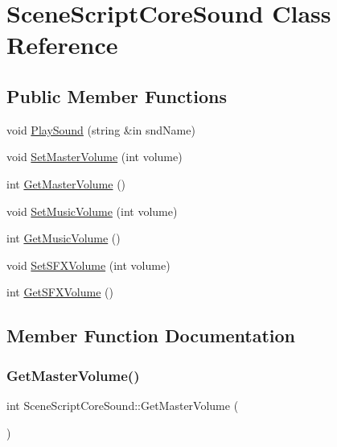 \hypertarget{class_scene_script_core_sound}{}\section{Scene\+Script\+Core\+Sound Class Reference}
\label{class_scene_script_core_sound}
\subsection*{Public Member Functions}
\begin{DoxyCompactItemize}
\item 
void \hyperlink{class_scene_script_core_sound_aa0169492bc4adbb81f3502794f80fbcc}{Play\+Sound} (string \&in snd\+Name)
\item 
void \hyperlink{class_scene_script_core_sound_a15e54703f9a6a80f347205fbe407c585}{Set\+Master\+Volume} (int volume)
\item 
int \hyperlink{class_scene_script_core_sound_af190be1232daf9d44919cadcca0ee026}{Get\+Master\+Volume} ()
\item 
void \hyperlink{class_scene_script_core_sound_a0f6cb5dd78736323d58d527136c833cf}{Set\+Music\+Volume} (int volume)
\item 
int \hyperlink{class_scene_script_core_sound_aca87f1d2aa9c85ad6e1b14fc1b273c3d}{Get\+Music\+Volume} ()
\item 
void \hyperlink{class_scene_script_core_sound_a6d388d0014651549decb4a7a981c24da}{Set\+S\+F\+X\+Volume} (int volume)
\item 
int \hyperlink{class_scene_script_core_sound_a239fa72d0cb855dbc792e477f05eba12}{Get\+S\+F\+X\+Volume} ()
\end{DoxyCompactItemize}


\subsection{Member Function Documentation}
\hypertarget{class_scene_script_core_sound_af190be1232daf9d44919cadcca0ee026}{}\label{class_scene_script_core_sound_af190be1232daf9d44919cadcca0ee026} 
\subsubsection{\texorpdfstring{Get\+Master\+Volume()}{GetMasterVolume()}}
{\footnotesize\ttfamily int Scene\+Script\+Core\+Sound\+::\+Get\+Master\+Volume (\begin{DoxyParamCaption}{ }\end{DoxyParamCaption})}

